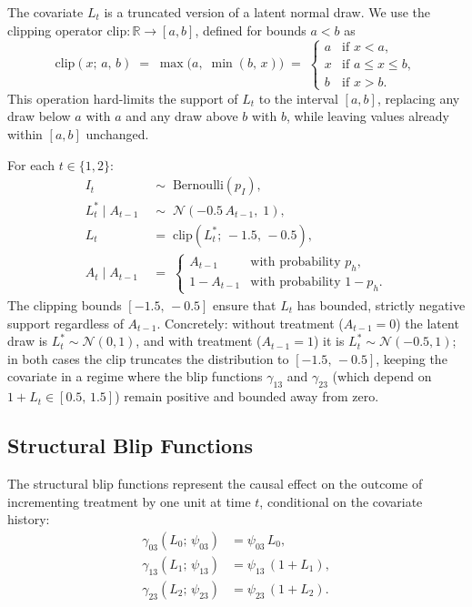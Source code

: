 \documentclass[12pt]{article}
\begin{document}
The covariate $L_t$ is a truncated version of a latent normal draw.
We use the clipping operator $\mathrm{clip}:\mathbb{R}\to[a,b]$, defined for
bounds $a < b$ as
\begin{equation}
  \mathrm{clip}(x;\,a,\,b)
  \;=\; \max\!\bigl(a,\;\min(b,\,x)\bigr)
  \;=\;
  \begin{cases}
    a & \text{if } x < a,\\
    x & \text{if } a \le x \le b,\\
    b & \text{if } x > b.
  \end{cases}
  \label{eq:clip}
\end{equation}
This operation hard-limits the support of $L_t$ to the interval $[a,b]$,
replacing any draw below $a$ with $a$ and any draw above $b$ with $b$, while
leaving values already within $[a,b]$ unchanged.

For each $t\in\{1,2\}$:
\begin{align*}
  I_t &\;\sim\; \mathrm{Bernoulli}(p_I),\\
  L_t^* \mid A_{t-1} &\;\sim\; \mathcal{N}(-0.5\,A_{t-1},\;1),\\
  L_t &\;=\; \mathrm{clip}(L_t^*;\,-1.5,\,-0.5),\\
  A_t \mid A_{t-1} &\;=\;
  \begin{cases}
    A_{t-1}   & \text{with probability }p_h,\\
    1-A_{t-1} & \text{with probability }1-p_h.
  \end{cases}
\end{align*}
The clipping bounds $[-1.5,\,-0.5]$ ensure that $L_t$ has bounded, strictly
negative support regardless of $A_{t-1}$.  Concretely: without treatment
($A_{t-1}=0$) the latent draw is $L_t^*\sim\mathcal{N}(0,1)$, and with
treatment ($A_{t-1}=1$) it is $L_t^*\sim\mathcal{N}(-0.5,1)$; in both cases
the clip truncates the distribution to $[-1.5,\,-0.5]$, keeping the covariate
in a regime where the blip functions $\gamma_{13}$ and $\gamma_{23}$ (which
depend on $1+L_t \in [0.5,\,1.5]$) remain positive and bounded away from zero.

\subsection{Structural Blip Functions}

The structural blip functions represent the causal effect on the outcome
of incrementing treatment by one unit at time $t$, conditional on the
covariate history:
\begin{align}
  \gamma_{03}(L_0;\,\psi_{03}) &= \psi_{03}\,L_0,\label{eq:blip0}\\
  \gamma_{13}(L_1;\,\psi_{13}) &= \psi_{13}\,(1+L_1),\label{eq:blip1}\\
  \gamma_{23}(L_2;\,\psi_{23}) &= \psi_{23}\,(1+L_2).\label{eq:blip2}
\end{align}
\end{document}
